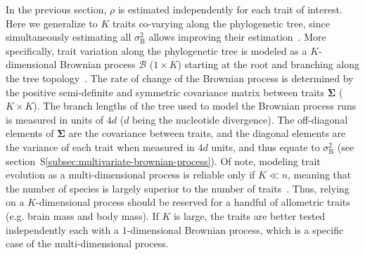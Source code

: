 \documentclass{article}
\newcommand{\UniDimArray}[1]{\bm{#1}}
\newcommand{\BiDimArray}[1]{\bm{#1}}
\newcommand{\NbrTaxa}{n}
\newcommand{\RateBetween}{\sigma^2_{\mathrm{B}}}
\newcommand{\NI}{\rho}
\newcommand{\Ntrait}{K}
\newcommand{\Covariancematrix}{\Sigma}
\newcommand{\CovarianceMatrix}{\BiDimArray{\Covariancematrix}}
\newcommand{\brownian}{\mathcal{B}}
\newcommand{\Brownian}{\UniDimArray{\brownian}}
\begin{document}
In the previous section, $\NI$ is estimated independently for each trait of interest.
Here we generalize to $\Ntrait$ traits co-varying along the phylogenetic tree, since simultaneously estimating all $\RateBetween$ allows improving their estimation~\citep{adams_multivariate_2018}.
More specifically, trait variation along the phylogenetic tree is modeled as a $\Ntrait$-dimensional Brownian process $\Brownian$ ($1 \times \Ntrait$) starting at the root and branching along the tree topology~\citep{huelsenbeck_detecting_2003, lartillot_phylogenetic_2011, lartillot_joint_2012, latrille_inferring_2021}.
The rate of change of the Brownian process is determined by the positive semi-definite and symmetric covariance matrix between traits $\CovarianceMatrix$ ($\Ntrait \times \Ntrait$).
The branch lengths of the tree used to model the Brownian process runs is measured in units of $4d$ ($d$ being the nucleotide divergence).
The off-diagonal elements of $\CovarianceMatrix$ are the covariance between traits, and the diagonal elements are the variance of each trait when measured in $4d$ units, and thus equate to $\RateBetween$ (see section~S\ref{subsec:multivariate-brownian-process}).
Of note, modeling trait evolution as a multi-dimensional process is reliable only if $\Ntrait \ll \NbrTaxa$, meaning that the number of species is largely superior to the number of traits~\citep{adams_multivariate_2018}.
Thus, relying on a $\Ntrait$-dimensional process should be reserved for a handful of allometric traits (e.g. brain mass and body mass).
If $\Ntrait$ is large, the traits are better tested independently each with a $1$-dimensional Brownian process, which is a specific case of the multi-dimensional process.
\end{document}

